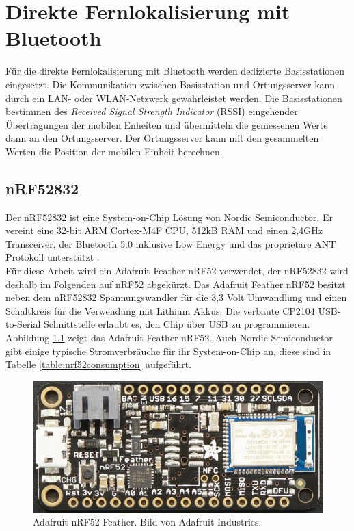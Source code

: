 \chapter{Direkte Fernlokalisierung mit Bluetooth}
\label{ch:phase3}
Für die direkte Fernlokalisierung mit Bluetooth werden dedizierte Basisstationen eingesetzt. 
Die Kommunikation zwischen Basisstation und Ortungsserver kann durch ein LAN- oder WLAN-Netzwerk gewährleistet werden.
Die Basisstationen bestimmen des \emph{Received Signal Strength Indicator} (RSSI) eingehender Übertragungen der mobilen Enheiten und übermitteln die gemessenen Werte dann an den Ortungsserver.
Der Ortungsserver kann mit den gesammelten Werten die Position der mobilen Einheit berechnen.

\section{nRF52832}
Der nRF52832 ist eine System-on-Chip Lösung von Nordic Semiconductor.
Er vereint eine 32-bit ARM Cortex-M4F CPU, 512kB RAM und einen 2,4GHz Transceiver, der Bluetooth 5.0 inklusive Low Energy und das proprietäre ANT Protokoll unterstützt \cite{nordic2017nrf}.\\
Für diese Arbeit wird ein Adafruit Feather nRF52 verwendet, der nRF52832 wird deshalb im Folgenden auf nRF52 abgekürzt.
Das Adafruit Feather nRF52 besitzt neben dem nRF52832 Spannungswandler für die 3,3 Volt Umwandlung und einen Schaltkreis für die Verwendung mit Lithium Akkus. 
Die verbaute CP2104 USB-to-Serial Schnittstelle erlaubt es, den Chip über USB zu programmieren.\\
Abbildung \ref{fig:nrf52layout} zeigt das Adafruit Feather nRF52.
Auch Nordic Semiconductor gibt einige typische Stromverbräuche für ihr System-on-Chip an, diese sind in Tabelle \ref{table:nrf52consumption} aufgeführt.

\begin{figure}[h]
  \centering
	\includegraphics[width=\textwidth]{images/nrf52ada.png}
  \caption{Adafruit nRF52 Feather. Bild von Adafruit Industries.}
  \label{fig:nrf52layout}
\end{figure}

